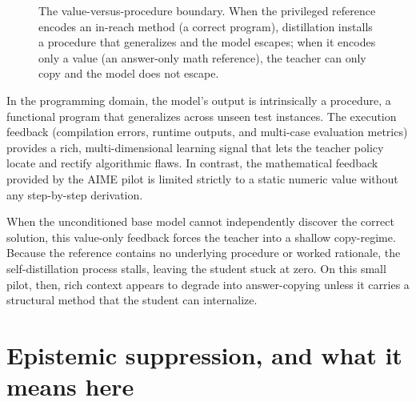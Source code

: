 \begin{figure}[htbp]
\centering
{}
\caption{The value-versus-procedure boundary. When the privileged reference encodes an in-reach method (a correct program), distillation installs a procedure that generalizes and the model escapes; when it encodes only a value (an answer-only math reference), the teacher can only copy and the model does not escape.}
\label{fig:bc-boundary}
\end{figure}

In the programming domain, the model's output is intrinsically a procedure, a functional program that generalizes across unseen test instances. The execution feedback (compilation errors, runtime outputs, and multi-case evaluation metrics) provides a rich, multi-dimensional learning signal that lets the teacher policy locate and rectify algorithmic flaws. In contrast, the mathematical feedback provided by the AIME pilot is limited strictly to a static numeric value without any step-by-step derivation.

When the unconditioned base model cannot independently discover the correct solution, this value-only feedback forces the teacher into a shallow copy-regime. Because the reference contains no underlying procedure or worked rationale, the self-distillation process stalls, leaving the student stuck at zero. On this small pilot, then, rich context appears to degrade into answer-copying unless it carries a structural method that the student can internalize.

\section{Epistemic suppression, and what it means here}\label{epistemic-suppression-and-what-it-means-here}

